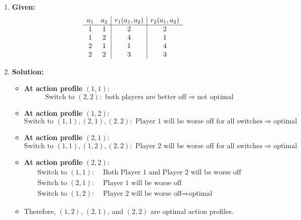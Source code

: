 \begin{example}
    \begin{enumerate}
        \item \textbf{Given:}
         \[
        \begin{array}{c c|c|c}
        a_1 & a_2 & r_1(a_1, a_2) & r_2(a_1, a_2) \\
        \hline
        1 & 1 & 2 & 2 \\
        1 & 2 & 4 & 1 \\
        2 & 1 & 1 & 4 \\
        2 & 2 & 3 & 3 \\
        \end{array}
        \]
        
        \item \textbf{Solution:}
        \begin{itemize}
            \item \textbf{At action profile }$(1,1)$:
            \[
            \text{Switch to }(2,2): \text{ both players are better off} \Rightarrow \text{not optimal}
            \]
        
            \item \textbf{At action profile }$(1,2)$:
            \[
            \text{Switch to }(1,1), (2,1), (2,2): \text{ Player 1 will be worse off for all switches} \Rightarrow \text{optimal}
            \]
        
            \item \textbf{At action profile }$(2,1)$:
            \[
            \text{Switch to }(1,1), (1,2), (2,2): \text{ Player 2 will be worse off for all switches} \Rightarrow \text{optimal}
            \]
        
            \item \textbf{At action profile }$(2,2)$:
            \begin{align*}
                \text{Switch to }(1,1): &\text{ Both Player 1 and Player 2 will be worse off} \\
                \text{Switch to }(2,1): &\text{ Player 1 will be worse off} \\
                \text{Switch to }(1,2): &\text{ Player 2 will be worse off} \Rightarrow \text{optimal} 
            \end{align*}
            \item Therefore, $(1,2)$, $(2,1)$, and $(2,2)$ are optimal action profiles.
        \end{itemize}
    \end{enumerate}
\end{example}
\newpage


